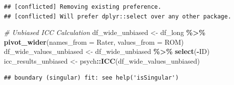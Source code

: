 \documentclass[
]{book}
\newenvironment{Shaded}{\begin{snugshade}}{\end{snugshade}}
\newcommand{\AttributeTok}[1]{\textcolor[rgb]{0.13,0.29,0.53}{#1}}
\newcommand{\CommentTok}[1]{\textcolor[rgb]{0.56,0.35,0.01}{\textit{#1}}}
\newcommand{\FunctionTok}[1]{\textcolor[rgb]{0.13,0.29,0.53}{\textbf{#1}}}
\newcommand{\NormalTok}[1]{#1}
\newcommand{\OtherTok}[1]{\textcolor[rgb]{0.56,0.35,0.01}{#1}}
\newcommand{\SpecialCharTok}[1]{\textcolor[rgb]{0.81,0.36,0.00}{\textbf{#1}}}
\begin{document}
\begin{verbatim}
## [conflicted] Removing existing preference.
## [conflicted] Will prefer dplyr::select over any other package.
\end{verbatim}

\begin{Shaded}
\begin{Highlighting}[]
\CommentTok{\# Unbiased ICC Calculation}
\NormalTok{df\_wide\_unbiased }\OtherTok{\textless{}{-}}\NormalTok{ df\_long }\SpecialCharTok{\%\textgreater{}\%}
  \FunctionTok{pivot\_wider}\NormalTok{(}\AttributeTok{names\_from =}\NormalTok{ Rater, }\AttributeTok{values\_from =}\NormalTok{ ROM)}
\NormalTok{df\_wide\_values\_unbiased }\OtherTok{\textless{}{-}}\NormalTok{ df\_wide\_unbiased }\SpecialCharTok{\%\textgreater{}\%} \FunctionTok{select}\NormalTok{(}\SpecialCharTok{{-}}\NormalTok{ID)}
\NormalTok{icc\_results\_unbiased }\OtherTok{\textless{}{-}}\NormalTok{ psych}\SpecialCharTok{::}\FunctionTok{ICC}\NormalTok{(df\_wide\_values\_unbiased)}
\end{Highlighting}
\end{Shaded}

\begin{verbatim}
## boundary (singular) fit: see help('isSingular')
\end{verbatim}
\end{document}
